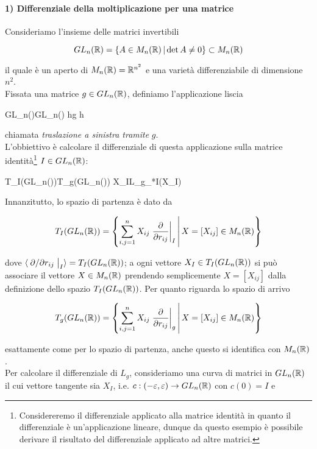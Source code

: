 \paragraph{1) Differenziale della moltiplicazione per una matrice}\label{trasl-diff}

Consideriamo l'insieme delle matrici invertibili

\begin{equation}
	GL_{n}(\mathbb{R}) = \left\{ A \in M_{n}(\mathbb{R}) \, \middle| \, \det A \neq 0 \right\} \subset M_{n}(\mathbb{R})
\end{equation}

il quale è un aperto di $ M_{n}(\mathbb{R}) = \mathbb{R}^{n^{2}} $ e una varietà differenziabile di dimensione $ n^{2} $.\\
Fissata una matrice $ g \in GL_{n}(\mathbb{R}) $, definiamo l'applicazione liscia

	{GL_{n}(\R)}{GL_{n}(\R)}
	{h}{g h}

chiamata \textit{traslazione a sinistra tramite} $ g $.\\
L'obbiettivo è calcolare il differenziale di questa applicazione sulla matrice identità\footnote{%
	Considereremo il differenziale applicato alla matrice identità in quanto il differenziale è un'applicazione lineare, dunque da questo esempio è possibile derivare il risultato del differenziale applicato ad altre matrici.%
} $ I \in GL_{n}(\mathbb{R}) $:

	{T_{I}(GL_{n}(\R))}{T_{g}(GL_{n}(\R))}
	{X_{I}}{L_{g_{*I}}(X_{I})}

Innanzitutto, lo spazio di partenza è dato da

\begin{equation}
	T_{I}(GL_{n}(\R)) = \left\{ \sum_{i,j=1}^{n} X_{ij} \eval{ \pdv{r_{ij}} }_{I} \st X=[X_{ij}] \in M_{n}(\R) \right\}
\end{equation}

dove $ \langle \eval{ \pdv*{r_{ij}} }_{I} \rangle = T_{I}(GL_{n}(\R)) $; a ogni vettore $ X_{I} \in T_{I}(GL_{n}(\mathbb{R})) $ si può associare il vettore $ X \in M_{n}(\mathbb{R}) $ prendendo semplicemente $ X=[X_{ij}] $ dalla definizione dello spazio $ T_{I}(GL_{n}(\mathbb{R})) $. Per quanto riguarda lo spazio di arrivo

\begin{equation}
	T_{g}(GL_{n}(\R)) = \left\{ \sum_{i,j=1}^{n} X_{ij} \eval{ \pdv{r_{ij}} }_{g} \st X=[X_{ij}] \in M_{n}(\R) \right\}
\end{equation}

esattamente come per lo spazio di partenza, anche questo si identifica con $ M_{n}(\mathbb{R}) $.\\
Per calcolare il differenziale di $ L_{g} $, consideriamo una curva di matrici in $ GL_{n}(\mathbb{R}) $ il cui vettore tangente sia $ X_{I} $, i.e. $ c : (-\varepsilon,\varepsilon) \to GL_{n}(\mathbb{R}) $ con $ c(0)=I $ e 

